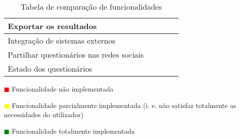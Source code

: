 \begin{table}[!ht]
\begin{center}
\begin{tabular}{|p{4cm}|p{0.1cm}|p{0.1cm}|p{0.1cm}|p{0.1cm}|}
			Exportar os resultados &\cellcolor{green!80}  & \cellcolor{green!80} & \cellcolor{green!80} & \cellcolor{green!80}  \\ \hline
			
			Integração de sistemas externos & \cellcolor{green!80}  & \cellcolor{green!80} & \cellcolor{green!80} & \cellcolor{red!80}  \\ \hline
			
			Partilhar questionários nas redes sociais &\cellcolor{green!80}  & \cellcolor{yellow!80} & \cellcolor{green!80} & \cellcolor{green!80}  \\ \hline
			
			Estado dos questionários &\cellcolor{green!80}  & \cellcolor{red!80} & \cellcolor{red!80} & \cellcolor{green!80}  \\ \hline
			
		
			
			
		\end{tabular}
	\end{center}
	\hspace{1.2cm}	\textcolor{red}{$\blacksquare$} Funcionalidade não implementada
	
	\hspace{1.2cm}     \textcolor{yellow}{$\blacksquare$} Funcionalidade parcialmente implementada (i. e. não satisfaz totalmente as necessidades do utilizador)
	
	\hspace{1.2cm}     \textcolor{green}{$\blacksquare$} Funcionalidade totalmente implementada 
	\begin{center}
		\caption{Tabela de comparação de funcionalidades}
		\label{tab:comparacao1}
	\end{center}
\end{table}

\newpage

